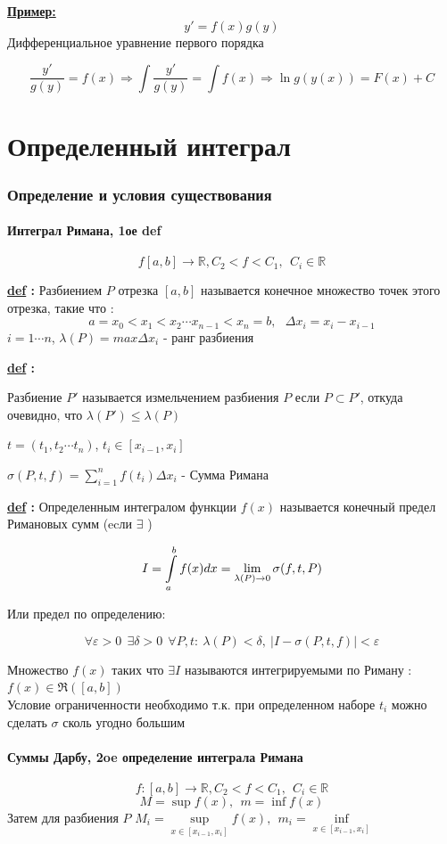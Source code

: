 \documentclass[a4paper,11pt]{article}
\renewcommand{\epsilon}{\ensuremath{\varepsilon}}
\newcommand{\Def}[1]{ 
\noindent\makebox[\linewidth]{\rule{\textwidth}{1pt}} 

 \noindent \textbf{\underline{def} :}
#1 

\noindent\makebox[\linewidth]{\rule{\textwidth}{1pt}} }
\newcommand{\R}{\mathbb{R}}
\newcommand{\ex}{ \noindent \underline{\textbf{Пример:}} \ \ }
\newcommand{\formula}[1]{
\begin{myquote} 
	\centering
	\begin{equation}
	{#1}
	\end{equation}
\end{myquote}
 }
\begin{document}
\ex 
\[
y'= f(x)g(y)
\]
Дифференциальное уравнение первого порядка

\[
\dfrac{y'}{g(y)} = f(x) \Rightarrow \int \dfrac{y'}{g(y)} = \int f(x) \Rightarrow \ln g(y(x)) = F(x) + C
\]

\part{Определенный интеграл}
\setcounter{section}{1}
\section{Определение и условия существования}
\subsection{Интеграл Римана, 1ое def}
\[
f [a, b] \rightarrow \R, C_2< f < C_1, \ \ C_i \in \R
\]
\Def{ Разбиением $P$ отрезка $[a, b]$ называется конечное множество точек этого отрезка, такие что :\[
a = x_0 < x_1 < x_2 \cdots x_{n-1} < x_n = b, \ \ \ \Delta x_i = x_i - x_{i - 1}
\]
$i = 1 \cdots n$, $\lambda(P) = max \Delta x_i $ - ранг разбиения
}

\Def{
Разбиение $P'$ называется измельчением разбиения $P$ если $P \subset P'$, откуда очевидно, что $\lambda(P') \leq \lambda(P)$

$t = (t_1, t_2 \cdots t_n)$,  $t_i \in [x_{i-1}, x_i]$ 

$\sigma(P,t,f) = \sum\limits_{i = 1}^n f(t_i) \Delta x_i$ - Сумма Римана}

\Def {\label{def:intRim}Определенным интегралом функции $f(x)$ называется конечный предел Римановых сумм (ecли $\exists$ )
\formula{
	\label{eq:intRim}
I = \int\limits_{a}^b f(x)dx = \lim \limits_{\lambda(P) \rightarrow 0} \sigma(f, t, P)
}
}
Или предел по определению:

\[
\forall \epsilon > 0 \ \ \exists \delta > 0 \ \ \forall P, t: \ \lambda(P) < \delta, \ |I - \sigma(P, t, f)| < \epsilon
\]

Множество $f(x)$ таких что $\exists I$ называются интегрируемыми по Риману : $f(x) \in \Re([a, b])$ \\ Условие ограниченности необходимо т.к. при определенном наборе $t_i$ можно сделать $\sigma$ сколь угодно большим

\subsection{Суммы Дарбу, 2oe определение интеграла Римана}
\[
f: [a, b] \rightarrow \R,  C_2<f<C_1, \ \  C_i \in \R
\]
\[
M = \sup f(x), \ \ m = \inf f(x)
\]
Затем для разбиения $P$ $M_i = \sup\limits_{x \in [x_{i-1}, x_i]} f(x), \ \ m_i = \inf\limits_{x \in [x_{i-1}, x_i]}$
\end{document}
